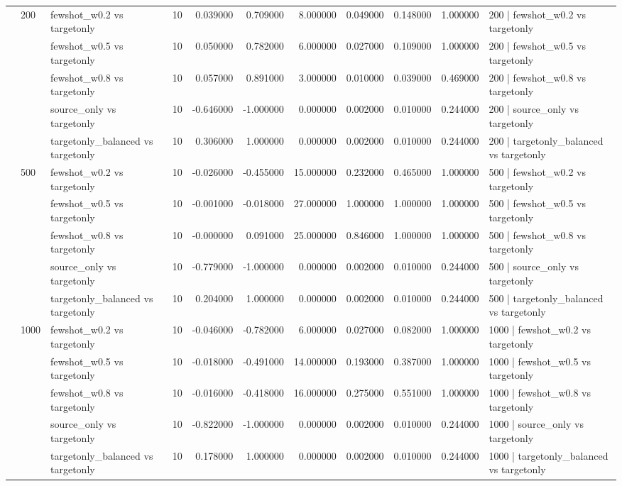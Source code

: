 \begin{tabular}{lllrrrrrrrl}
\cline{2-11}
 & \multirow[t]{5}{*}{200} & fewshot_w0.2 vs targetonly & 10 & 0.039000 & 0.709000 & 8.000000 & 0.049000 & 0.148000 & 1.000000 & 200 | fewshot_w0.2 vs targetonly \\
 &  & fewshot_w0.5 vs targetonly & 10 & 0.050000 & 0.782000 & 6.000000 & 0.027000 & 0.109000 & 1.000000 & 200 | fewshot_w0.5 vs targetonly \\
 &  & fewshot_w0.8 vs targetonly & 10 & 0.057000 & 0.891000 & 3.000000 & 0.010000 & 0.039000 & 0.469000 & 200 | fewshot_w0.8 vs targetonly \\
 &  & source_only vs targetonly & 10 & -0.646000 & -1.000000 & 0.000000 & 0.002000 & 0.010000 & 0.244000 & 200 | source_only vs targetonly \\
 &  & targetonly_balanced vs targetonly & 10 & 0.306000 & 1.000000 & 0.000000 & 0.002000 & 0.010000 & 0.244000 & 200 | targetonly_balanced vs targetonly \\
\cline{2-11}
 & \multirow[t]{5}{*}{500} & fewshot_w0.2 vs targetonly & 10 & -0.026000 & -0.455000 & 15.000000 & 0.232000 & 0.465000 & 1.000000 & 500 | fewshot_w0.2 vs targetonly \\
 &  & fewshot_w0.5 vs targetonly & 10 & -0.001000 & -0.018000 & 27.000000 & 1.000000 & 1.000000 & 1.000000 & 500 | fewshot_w0.5 vs targetonly \\
 &  & fewshot_w0.8 vs targetonly & 10 & -0.000000 & 0.091000 & 25.000000 & 0.846000 & 1.000000 & 1.000000 & 500 | fewshot_w0.8 vs targetonly \\
 &  & source_only vs targetonly & 10 & -0.779000 & -1.000000 & 0.000000 & 0.002000 & 0.010000 & 0.244000 & 500 | source_only vs targetonly \\
 &  & targetonly_balanced vs targetonly & 10 & 0.204000 & 1.000000 & 0.000000 & 0.002000 & 0.010000 & 0.244000 & 500 | targetonly_balanced vs targetonly \\
\cline{2-11}
 & \multirow[t]{5}{*}{1000} & fewshot_w0.2 vs targetonly & 10 & -0.046000 & -0.782000 & 6.000000 & 0.027000 & 0.082000 & 1.000000 & 1000 | fewshot_w0.2 vs targetonly \\
 &  & fewshot_w0.5 vs targetonly & 10 & -0.018000 & -0.491000 & 14.000000 & 0.193000 & 0.387000 & 1.000000 & 1000 | fewshot_w0.5 vs targetonly \\
 &  & fewshot_w0.8 vs targetonly & 10 & -0.016000 & -0.418000 & 16.000000 & 0.275000 & 0.551000 & 1.000000 & 1000 | fewshot_w0.8 vs targetonly \\
 &  & source_only vs targetonly & 10 & -0.822000 & -1.000000 & 0.000000 & 0.002000 & 0.010000 & 0.244000 & 1000 | source_only vs targetonly \\
 &  & targetonly_balanced vs targetonly & 10 & 0.178000 & 1.000000 & 0.000000 & 0.002000 & 0.010000 & 0.244000 & 1000 | targetonly_balanced vs targetonly \\
\cline{1-11} \cline{2-11}
\bottomrule
\end{tabular}
